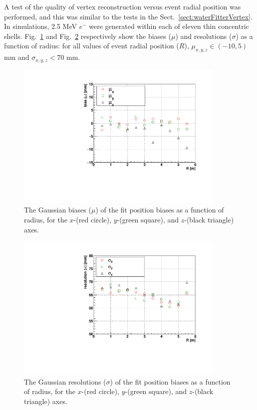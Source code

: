 A test of the quality of vertex reconstruction versus event radial position was performed, and this was similar to the tests in the Sect.~\ref{sect:waterFitterVertex}. In simulations, 2.5 MeV $e^-$ were generated within each of eleven thin concentric shells. Fig.~\ref{fig:scintShellVsBias} and Fig.~\ref{fig:scintShellVsResol} respectively show the biases ($\mu$) and resolutions ($\sigma$) as a function of radius: for all values of event radial position ($R$), $\mu_{x,y,z}\in(-10,5)$ mm and $\sigma_{x,y,z} < 70$ mm. 

\begin{figure}[!htb]
	\centering
	\includegraphics[width=10cm]{shellTestScintFitter_RvsBias.pdf}
	\caption[The Gaussian biases ($\mu$) of the \texttt{MP scint fitter} fit position biases as a function of radius, for the $x$, $y$, and $z$ axes.]{The Gaussian biases ($\mu$) of the fit position biases as a function of radius, for the $x$-(red circle), $y$-(green square), and $z$-(black triangle) axes.}
	\label{fig:scintShellVsBias}
\end{figure}

\begin{figure}[!htb]
	\centering
	\includegraphics[width=10cm]{shellTestScintFitter_RvsResol.pdf}
	\caption[The Gaussian resolutions ($\sigma$) of the \texttt{MP scint fitter} fit position biases as a function of radius, for the $x$, $y$, and $z$  axes.]{The Gaussian resolutions ($\sigma$) of the fit position biases as a function of radius, for the $x$-(red circle), $y$-(green square), and $z$-(black triangle) axes.}
	\label{fig:scintShellVsResol}
\end{figure}

